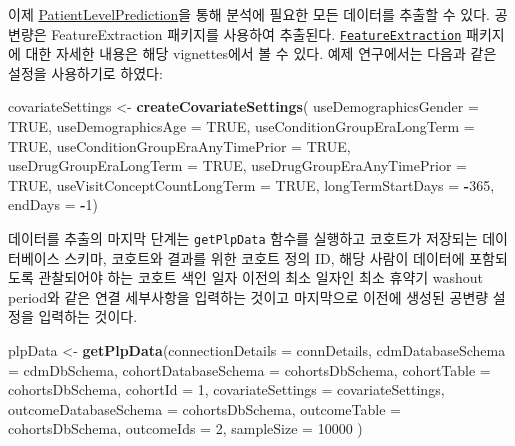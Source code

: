\documentclass[10.5pt]{book}
\newenvironment{Shaded}{\begin{snugshade}}{\end{snugshade}}
\newcommand{\KeywordTok}[1]{\textcolor[rgb]{0.13,0.29,0.53}{\textbf{#1}}}
\newcommand{\DataTypeTok}[1]{\textcolor[rgb]{0.13,0.29,0.53}{#1}}
\newcommand{\DecValTok}[1]{\textcolor[rgb]{0.00,0.00,0.81}{#1}}
\newcommand{\StringTok}[1]{\textcolor[rgb]{0.31,0.60,0.02}{#1}}
\newcommand{\OtherTok}[1]{\textcolor[rgb]{0.56,0.35,0.01}{#1}}
\newcommand{\OperatorTok}[1]{\textcolor[rgb]{0.81,0.36,0.00}{\textbf{#1}}}
\newcommand{\NormalTok}[1]{#1}
\theoremstyle{definition}
\theoremstyle{definition}
\theoremstyle{definition}
\theoremstyle{remark}
\begin{document}
이제
\href{https://ohdsi.github.io/PatientLevelPrediction/}{PatientLevelPrediction}을
통해 분석에 필요한 모든 데이터를 추출할 수 있다. 공변량은
FeatureExtraction 패키지를 사용하여 추출된다.
\href{https://ohdsi.github.io/FeatureExtraction/}{\texttt{FeatureExtraction}}
패키지에 대한 자세한 내용은 해당 vignettes에서 볼 수 있다. 예제
연구에서는 다음과 같은 설정을 사용하기로 하였다:

\begin{Shaded}
\begin{Highlighting}[]
\NormalTok{covariateSettings <-}\StringTok{ }\KeywordTok{createCovariateSettings}\NormalTok{(}
\DataTypeTok{useDemographicsGender =} \OtherTok{TRUE}\NormalTok{,}
                          \DataTypeTok{useDemographicsAge =} \OtherTok{TRUE}\NormalTok{,}
                          \DataTypeTok{useConditionGroupEraLongTerm =} \OtherTok{TRUE}\NormalTok{,}
                          \DataTypeTok{useConditionGroupEraAnyTimePrior =} \OtherTok{TRUE}\NormalTok{,}
                          \DataTypeTok{useDrugGroupEraLongTerm =} \OtherTok{TRUE}\NormalTok{,}
                          \DataTypeTok{useDrugGroupEraAnyTimePrior =} \OtherTok{TRUE}\NormalTok{,}
                          \DataTypeTok{useVisitConceptCountLongTerm =} \OtherTok{TRUE}\NormalTok{,}
                          \DataTypeTok{longTermStartDays =} \OperatorTok{-}\DecValTok{365}\NormalTok{,}
                          \DataTypeTok{endDays =} \OperatorTok{-}\DecValTok{1}\NormalTok{)}
\end{Highlighting}
\end{Shaded}

데이터를 추출의 마지막 단계는 \texttt{getPlpData} 함수를 실행하고
코호트가 저장되는 데이터베이스 스키마, 코호트와 결과를 위한 코호트 정의
ID, 해당 사람이 데이터에 포함되도록 관찰되어야 하는 코호트 색인 일자
이전의 최소 일자인 최소 휴약기 washout period와 같은 연결 세부사항을
입력하는 것이고 마지막으로 이전에 생성된 공변량 설정을 입력하는 것이다.

\begin{Shaded}
\begin{Highlighting}[]
\NormalTok{plpData <-}\StringTok{ }\KeywordTok{getPlpData}\NormalTok{(}\DataTypeTok{connectionDetails =}\NormalTok{ connDetails,}
                      \DataTypeTok{cdmDatabaseSchema =}\NormalTok{ cdmDbSchema,}
                      \DataTypeTok{cohortDatabaseSchema =}\NormalTok{ cohortsDbSchema,}
                      \DataTypeTok{cohortTable =}\NormalTok{ cohortsDbSchema,}
                      \DataTypeTok{cohortId =} \DecValTok{1}\NormalTok{,}
                      \DataTypeTok{covariateSettings =}\NormalTok{ covariateSettings,}
                      \DataTypeTok{outcomeDatabaseSchema =}\NormalTok{ cohortsDbSchema,}
                      \DataTypeTok{outcomeTable =}\NormalTok{ cohortsDbSchema,}
                      \DataTypeTok{outcomeIds =} \DecValTok{2}\NormalTok{,}
                      \DataTypeTok{sampleSize =} \DecValTok{10000}
\NormalTok{)}
\end{Highlighting}
\end{Shaded}
\end{document}

